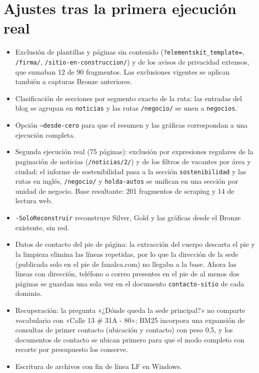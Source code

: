 \section{Ajustes tras la primera ejecución real}
\begin{itemize}
  \item Exclusión de plantillas y páginas sin contenido (\texttt{?elementskit\_template=}, \texttt{/firma/},
        \texttt{/sitio-en-construccion/}) y de los avisos de privacidad extensos, que sumaban 12 de 90 fragmentos.
        Las exclusiones vigentes se aplican también a capturas Bronze anteriores.
  \item Clasificación de secciones por segmento exacto de la ruta: las entradas del blog se agrupan en
        \texttt{noticias} y las rutas \texttt{/negocio/} se unen a \texttt{negocios}.
  \item Opción \texttt{--desde-cero} para que el resumen y las gráficas correspondan a una ejecución completa.
  \item Segunda ejecución real (75 páginas): exclusión por expresiones regulares de la paginación de noticias
        (\texttt{/noticias/2/}) y de los filtros de vacantes por área y ciudad; el informe de sostenibilidad pasa a
        la sección \texttt{sostenibilidad} y las rutas en inglés, \texttt{/negocio/} y \texttt{holda-autos} se unifican
        en una sección por unidad de negocio. Base resultante: 201 fragmentos de scraping y 14 de lectura web.
  \item \texttt{-SoloReconstruir} reconstruye Silver, Gold y las gráficas desde el Bronze existente, sin red.
  \item Datos de contacto del pie de página: la extracción del cuerpo descarta el pie y la limpieza elimina las
        líneas repetidas, por lo que la dirección de la sede (publicada solo en el pie de fanalca.com) no llegaba a
        la base. Ahora las líneas con dirección, teléfono o correo presentes en el pie de al menos dos páginas se
        guardan una sola vez en el documento \texttt{contacto-sitio} de cada dominio.
  \item Recuperación: la pregunta «¿Dónde queda la sede principal?» no comparte vocabulario con
        «Calle 13 \# 31A - 80»; BM25 incorpora una expansión de consultas de primer contacto (ubicación y
        contacto) con peso 0,5, y los documentos de contacto se ubican primero para que el modo completo con
        recorte por presupuesto los conserve.
  \item Escritura de archivos con fin de línea LF en Windows.
\end{itemize}

